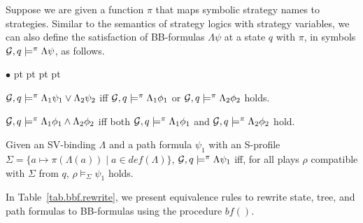 \documentclass[11pt]{article}
\newcommand{\embf}{\textit{bf}}
\newcommand{\emdef}{\textit{def}}
\newcommand{\calg}{{\cal G}}
\newenvironment{list1}{\begin{list}{$\bullet$}
{\topsep 0 pt \parsep 0 pt \partopsep 0 pt \itemsep 0 pt}}{\end{list}}
\begin{document}
Suppose we are given a function $\pi$ that maps symbolic strategy 
names to strategies.  
Similar to the semantics of 
strategy logics \cite{MMV10} with strategy variables, 
we can also define the satisfaction of BB-formulas 
$\Lambda\psi$ at a state $q$ with $\pi$, 
in symbols $\calg,q\models^\pi\Lambda\psi$,  
as follows. 
\begin{list1} 
\item $\calg,q\models^\pi \Lambda_1\psi_1\vee\Lambda_2\psi_2$ iff 
	$\calg,q\models^\pi \Lambda_1\phi_1$ or 
	$\calg,q\models^\pi \Lambda_2\phi_2$ holds. 
\item $\calg,q\models^\pi \Lambda_1\phi_1\wedge\Lambda_2\phi_2$ iff both 
	$\calg,q\models^\pi \Lambda_1\phi_1$ and  
	$\calg,q\models^\pi \Lambda_2\phi_2$ hold. 
\item Given an SV-binding $\Lambda$ and a path formula $\psi_1$ with  
	an S-profile 
	$\Sigma=\{a\mapsto \pi(\Lambda(a))\mid a\in\emdef(\Lambda)\}$, 
	$\calg,q\models^\pi \Lambda\psi_1$ iff, for all plays $\rho$ 
	compatible with $\Sigma$ from $q$, 
	$\rho\models_\Sigma \psi_1$ holds. 
\end{list1} 
In Table~\ref{tab.bbf.rewrite}, 
we present equivalence rules to rewrite state, tree, and path 
formulas to BB-formulas 
using the procedure $\embf()$.  
\end{document}

